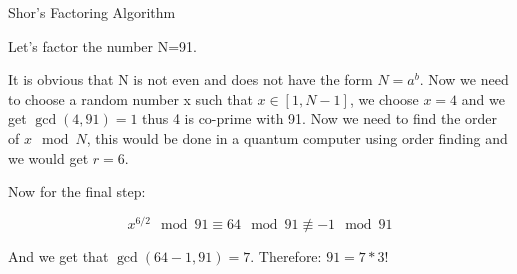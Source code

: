 \begin{algorithm}[H]
\SetAlgoLined
{}
 \caption{Shor's Factoring Algorithm}
\end{algorithm}

\begin{example}
Let's factor the number N=91.

It is obvious that N is not even and does not have the form $N=a^b$. Now we need to choose a random number x such that $x \in [1, N-1]$, we choose $x=4$ and we get $\gcd(4,91) = 1$ thus 4 is co-prime with 91.
Now we need to find the order of $x \mod N$, this would be done in a quantum computer using order finding and we would get $r=6$. 

Now for the final step:

\begin{equation*}
    x^{6/2} \mod 91 \equiv 64 \mod 91 \not\equiv -1 \mod 91
\end{equation*}

And we get that $\gcd(64-1,91)=7$. Therefore: $91=7*3$!
\end{example}

